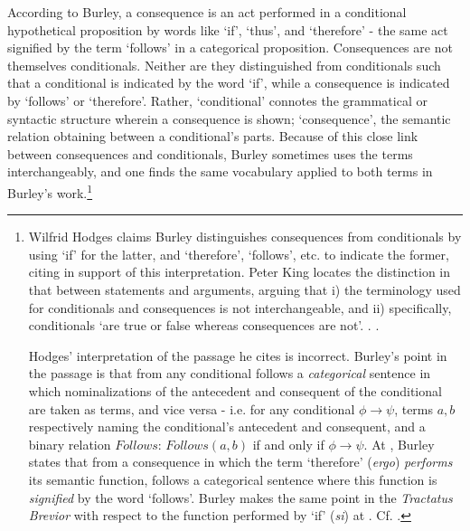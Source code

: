 \documentclass[]{birkjour}
\begin{document}
According to Burley, a consequence is an act performed in a conditional hypothetical proposition by words like `if', `thus', and `therefore' - the same act signified by the term `follows' in a categorical proposition. Consequences are not themselves conditionals. Neither are they distinguished from conditionals such that a conditional is indicated by the word `if', while a consequence is indicated by `follows' or `therefore'. Rather, `conditional' connotes the grammatical or syntactic structure wherein a consequence is shown; `consequence', the semantic relation obtaining between a conditional's parts. Because of this close link between consequences and conditionals, Burley sometimes uses the terms interchangeably, and one finds the same vocabulary applied to both terms in Burley's work.\footnote{Wilfrid Hodges claims Burley distinguishes consequences from conditionals by using `if' for the latter, and `therefore', `follows', etc. to indicate the former, citing \autocite[p. 78.10-20]{BurleyDPAL} in support of this interpretation. Peter King locates the distinction in that between statements and arguments, arguing that i) the terminology used for conditionals and consequences is not interchangeable, and ii) specifically, conditionals `are true or false whereas consequences are not'. \cite{HodgesBurley}. \cite[p. 120]{King2001}.
	
	Hodges' interpretation of the passage he cites is incorrect. Burley's point in the passage is that from any conditional follows a \textit{categorical} sentence in which nominalizations of the antecedent and consequent of the conditional are taken as terms, and vice versa - i.e. for any conditional $\phi \rightarrow \psi$, terms $a, b$ respectively naming the conditional's antecedent and consequent, and a binary relation $Follows$: $Follows(a, b)$ if and only if $\phi \rightarrow \psi$. At \autocite[p. 141.26-30]{BurleyDPAL}, Burley states that from a consequence in which the term `therefore' (\textit{ergo}) \textit{performs} its semantic function, follows a categorical sentence where this function is \textit{signified} by the word `follows'. Burley makes the same point in the \textit{Tractatus Brevior} with respect to the function performed by `if' (\textit{si}) at \autocite[p. 219.1-9]{BurleyDPAL}. Cf. \cite[p. 143, par. 119]{Green-Pedersen1980b}.
	
}
\end{document}
